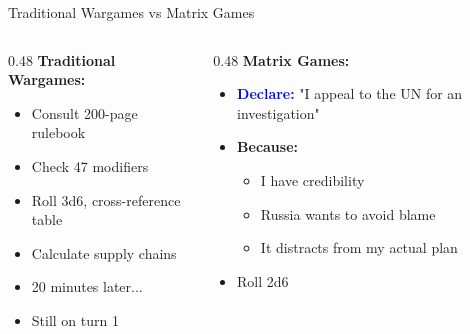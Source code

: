 \documentclass[aspectratio=169]{beamer}
\begin{document}
\begin{frame}{Traditional Wargames vs Matrix Games}
  \begin{columns}[T]
    \begin{column}{0.48\textwidth}
      \textbf{Traditional Wargames:}
      \begin{itemize}
        \item Consult 200-page rulebook
        \item Check 47 modifiers
        \item Roll 3d6, cross-reference table
        \item Calculate supply chains
        \item 20 minutes later...
        \item Still on turn 1
      \end{itemize}
    \end{column}

    \begin{column}{0.48\textwidth}
      \textbf{Matrix Games:}
      \begin{itemize}
        \item \textcolor{blue}{\textbf{Declare:}} "I appeal to the UN for an investigation"
        \item \textcolor{green!60!black}{\textbf{Because:}}
          \begin{itemize}
            \item I have credibility
            \item Russia wants to avoid blame
            \item It distracts from my actual plan
          \end{itemize}
        \item Roll 2d6
      \end{itemize}
    \end{column}
  \end{columns}

  \vspace{1em}
  \centering
\end{frame}
\end{document}
